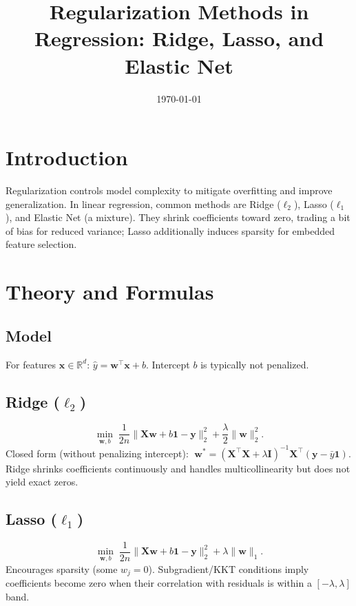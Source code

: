\documentclass{article}
\title{Regularization Methods in Regression: Ridge, Lasso, and Elastic Net}
\author{}
\date{\today}
\begin{document}
\maketitle

\section{Introduction}
Regularization controls model complexity to mitigate overfitting and improve generalization. In linear regression, common methods are Ridge (\(\ell_2\)), Lasso (\(\ell_1\)), and Elastic Net (a mixture). They shrink coefficients toward zero, trading a bit of bias for reduced variance; Lasso additionally induces sparsity for embedded feature selection.

\section{Theory and Formulas}
\subsection{Model}
For features \(\mathbf{x} \in \mathbb{R}^d\): \(\hat{y} = \mathbf{w}^\top \mathbf{x} + b\). Intercept \(b\) is typically not penalized.

\subsection{Ridge (\(\ell_2\))}
\begin{equation}
\min_{\mathbf{w},b}\; \frac{1}{2n}\lVert \mathbf{X}\mathbf{w} + b\mathbf{1} - \mathbf{y} \rVert_2^2 + \frac{\lambda}{2} \lVert \mathbf{w} \rVert_2^2.
\end{equation}
Closed form (without penalizing intercept): \(\;\mathbf{w}^* = (\mathbf{X}^\top\mathbf{X} + \lambda \mathbf{I})^{-1}\mathbf{X}^\top(\mathbf{y}-\bar{y}\mathbf{1})\). Ridge shrinks coefficients continuously and handles multicollinearity but does not yield exact zeros.

\subsection{Lasso (\(\ell_1\))}
\begin{equation}
\min_{\mathbf{w},b}\; \frac{1}{2n}\lVert \mathbf{X}\mathbf{w} + b\mathbf{1} - \mathbf{y} \rVert_2^2 + \lambda \lVert \mathbf{w} \rVert_1.
\end{equation}
Encourages sparsity (some \(w_j=0\)). Subgradient/KKT conditions imply coefficients become zero when their correlation with residuals is within a \([-\lambda,\lambda]\) band.
\end{document}
